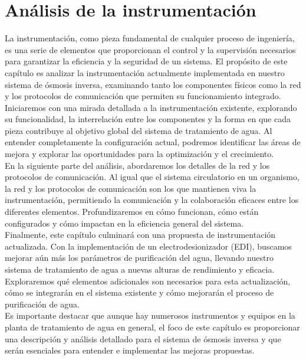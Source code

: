 \chapter{Análisis de la instrumentación}

La instrumentación, como pieza fundamental de cualquier proceso de ingeniería, es una serie de
elementos que proporcionan el control y la supervisión necesarios para garantizar la eficiencia y la
seguridad de un sistema. El propósito de este capítulo es analizar la instrumentación actualmente
implementada en nuestro sistema de ósmosis inversa, examinando tanto los componentes físicos
como la red y los protocolos de comunicación que permiten su funcionamiento integrado.\\

Iniciaremos con una mirada detallada a la instrumentación existente, explorando su funcionalidad,
la interrelación entre los componentes y la forma en que cada pieza contribuye al objetivo global del
sistema de tratamiento de agua. Al entender completamente la configuración actual, podremos identificar
las áreas de mejora y explorar las oportunidades para la optimización y el crecimiento.\\

En la siguiente parte del análisis, abordaremos los detalles de la red y los protocolos de
comunicación. Al igual que el sistema circulatorio en un organismo, la red y los protocolos de
comunicación son los que mantienen viva la instrumentación, permitiendo la comunicación y la colaboración
eficaces entre los diferentes elementos. Profundizaremos en cómo funcionan, cómo están configurados y
cómo impactan en la eficiencia general del sistema.\\

Finalmente, este capítulo culminará con una propuesta de instrumentación actualizada. Con la
implementación de un electrodesionizador (EDI), buscamos mejorar aún más los parámetros de purificación del agua,
llevando nuestro sistema de tratamiento de agua a nuevas alturas de rendimiento y eficacia. Exploraremos qué
elementos adicionales son necesarios para esta actualización, cómo se integrarán en el sistema existente y cómo
mejorarán el proceso de purificación de agua.\\

Es importante destacar que aunque hay numerosos instrumentos y equipos en la planta de tratamiento de agua en general,
el foco de este capítulo es proporcionar una descripción y análisis detallado  para el sistema
de ósmosis inversa y que serán esenciales para entender e implementar las mejoras propuestas.\\









